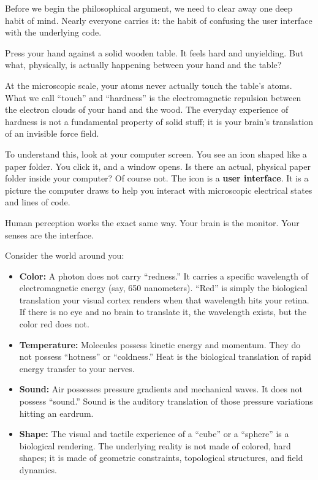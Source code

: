 \documentclass[11pt]{article}
\theoremstyle{canonstyle}
\begin{document}
Before we begin the philosophical argument, we need to clear away one deep habit of mind. Nearly everyone carries it: the habit of confusing the user interface with the underlying code.

\begin{reflect}
Press your hand against a solid wooden table. It feels hard and unyielding. But what, physically, is actually happening between your hand and the table?
\end{reflect}

At the microscopic scale, your atoms never actually touch the table's atoms. What we call ``touch'' and ``hardness'' is the electromagnetic repulsion between the electron clouds of your hand and the wood. The everyday experience of hardness is not a fundamental property of solid stuff; it is your brain's translation of an invisible force field. 

To understand this, look at your computer screen. You see an icon shaped like a paper folder. You click it, and a window opens. Is there an actual, physical paper folder inside your computer? Of course not. The icon is a \textbf{user interface}. It is a picture the computer draws to help you interact with microscopic electrical states and lines of code. 

Human perception works the exact same way. Your brain is the monitor. Your senses are the interface. 

Consider the world around you:
\begin{itemize}
    \item \textbf{Color:} A photon does not carry ``redness.'' It carries a specific wavelength of electromagnetic energy (say, 650 nanometers). ``Red'' is simply the biological translation your visual cortex renders when that wavelength hits your retina. If there is no eye and no brain to translate it, the wavelength exists, but the color red does not.
    \item \textbf{Temperature:} Molecules possess kinetic energy and momentum. They do not possess ``hotness'' or ``coldness.'' Heat is the biological translation of rapid energy transfer to your nerves.
    \item \textbf{Sound:} Air possesses pressure gradients and mechanical waves. It does not possess ``sound.'' Sound is the auditory translation of those pressure variations hitting an eardrum.
    \item \textbf{Shape:} The visual and tactile experience of a ``cube'' or a ``sphere'' is a biological rendering. The underlying reality is not made of colored, hard shapes; it is made of geometric constraints, topological structures, and field dynamics.
\end{itemize}
\end{document}
